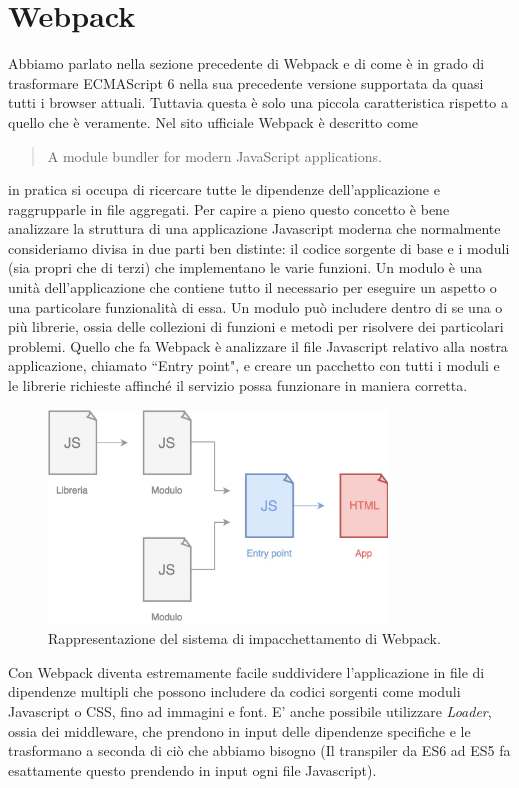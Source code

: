 \section{Webpack}
Abbiamo parlato nella sezione precedente di Webpack e di come è in grado di trasformare ECMAScript 6 nella sua precedente versione supportata da quasi tutti i browser attuali. Tuttavia questa è solo una piccola caratteristica rispetto a quello che è veramente.
Nel sito ufficiale Webpack è descritto come \blockquote{A module bundler for modern JavaScript applications.} in pratica si occupa di ricercare tutte le dipendenze dell'applicazione e raggrupparle in file aggregati. 
Per capire a pieno questo concetto è bene analizzare la struttura di una applicazione Javascript moderna che normalmente consideriamo divisa in due parti ben distinte: il codice sorgente di base e i moduli (sia propri che di terzi) che implementano le varie funzioni. Un modulo è una unità dell'applicazione che contiene tutto il necessario per eseguire un aspetto o una particolare funzionalità di essa. Un modulo può includere dentro di se una o più librerie, ossia delle collezioni di funzioni e metodi per risolvere dei particolari problemi. Quello che fa Webpack è analizzare il file Javascript relativo alla nostra applicazione, chiamato “Entry point", e creare un pacchetto con tutti i moduli e le librerie richieste affinché il servizio possa funzionare in maniera corretta. 

\begin{figure}[h]
\centering
\includegraphics[width=9cm]{./images/webpackWorkflow}
\caption{Rappresentazione del sistema di impacchettamento di Webpack.}
\end{figure}

\noindent
Con Webpack diventa estremamente facile suddividere l'applicazione in file di dipendenze multipli che possono includere da codici sorgenti come moduli Javascript o CSS, fino ad immagini e font.
E' anche possibile utilizzare \textit{Loader}, ossia dei middleware, che prendono in input delle dipendenze specifiche e le trasformano a seconda di ciò che abbiamo bisogno (Il transpiler da ES6 ad ES5 fa esattamente questo prendendo in input ogni file Javascript).

